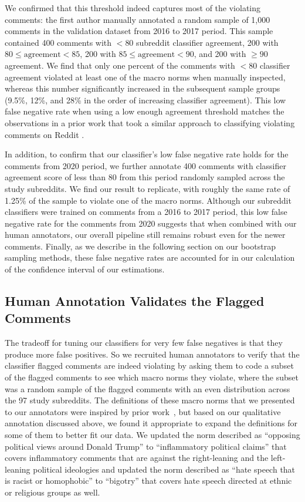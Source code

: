 We confirmed that this threshold indeed captures most of the violating comments: the first author manually annotated a random sample of 1,000 comments in the validation dataset from 2016 to 2017 period. This sample contained 400 comments with $< 80$ subreddit classifier agreement, 200 with $80 \leq \text{agreement} < 85 $, 200 with $85 \leq \text{agreement} < 90$, and 200 with $\geq 90$ agreement. We find that only one percent of the comments with $< 80$ classifier agreement violated at least one of the macro norms when manually inspected, whereas this number significantly increased in the subsequent sample groups (9.5\%, 12\%, and 28\% in the order of increasing classifier agreement). This low false negative rate when using a low enough agreement threshold matches the observations in a prior work that took a similar approach to classifying violating comments on Reddit \cite{chandrasekharan2019crossmod}.

In addition, to confirm that our classifier's low false negative rate holds for the comments from 2020 period, we further annotate 400 comments with classifier agreement score of less than 80 from this period randomly sampled across the study subreddits. We find our result to replicate, with roughly the same rate of 1.25\% of the sample to violate one of the macro norms. Although our subreddit classifiers were trained on comments from a 2016 to 2017 period, this low false negative rate for the comments from 2020 suggests that when combined with our human annotators, our overall pipeline still remains robust even for the newer comments. Finally, as we describe in the following section on our bootstrap sampling methods, these false negative rates are accounted for in our calculation of the confidence interval of our estimations.


\subsection{Human Annotation Validates the Flagged Comments}
\label{sec:annotation}
The tradeoff for tuning our classifiers for very few false negatives is that they produce more false positives. So we recruited human annotators to verify that the classifier flagged comments are indeed violating by asking them to code a subset of the flagged comments to see which macro norms they violate, where the subset was a random sample of the flagged comments with an even distribution across the 97 study subreddits. The definitions of these macro norms that we presented to our annotators were inspired by prior work~\cite{Chandrasekharan2018internet}, but based on our qualitative annotation discussed above, we found it appropriate to expand the definitions for some of them to better fit our data. We updated the norm described as ``opposing political views around Donald Trump'' to ``inflammatory political claims'' that covers inflammatory comments that are against the right-leaning and the left-leaning political ideologies and updated the norm described as ``hate speech that is racist or homophobic'' to ``bigotry'' that covers hate speech directed at ethnic or religious groups as well. 

